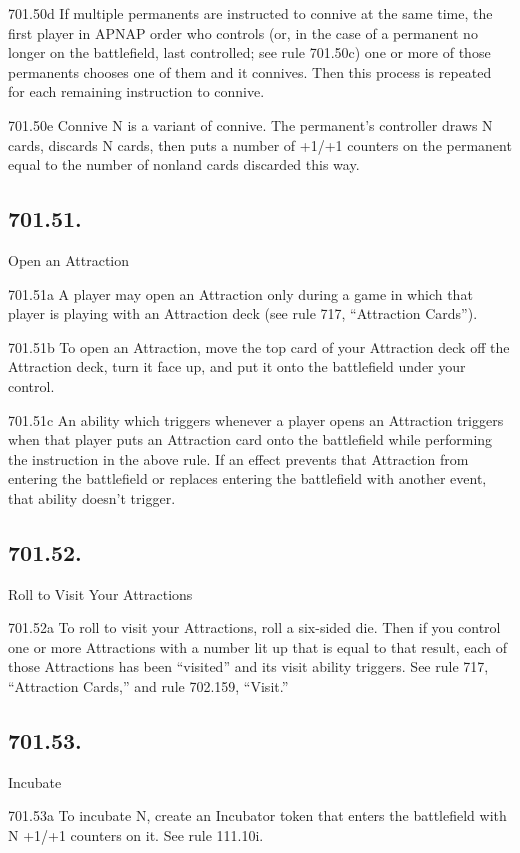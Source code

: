 701.50d If multiple permanents are instructed to connive at the same time, the first player in APNAP order who controls (or, in the case of a permanent no longer on the battlefield, last controlled; see rule 701.50c) one or more of those permanents chooses one of them and it connives. Then this process is repeated for each remaining instruction to connive.

701.50e Connive N is a variant of connive. The permanent’s controller draws N cards, discards N cards, then puts a number of +1/+1 counters on the permanent equal to the number of nonland cards discarded this way.

\subsection*{701.51.}
Open an Attraction

701.51a A player may open an Attraction only during a game in which that player is playing with an Attraction deck (see rule 717, “Attraction Cards”).

701.51b To open an Attraction, move the top card of your Attraction deck off the Attraction deck, turn it face up, and put it onto the battlefield under your control.

701.51c An ability which triggers whenever a player opens an Attraction triggers when that player puts an Attraction card onto the battlefield while performing the instruction in the above rule. If an effect prevents that Attraction from entering the battlefield or replaces entering the battlefield with another event, that ability doesn’t trigger.

\subsection*{701.52.}
Roll to Visit Your Attractions

701.52a To roll to visit your Attractions, roll a six-sided die. Then if you control one or more Attractions with a number lit up that is equal to that result, each of those Attractions has been “visited” and its visit ability triggers. See rule 717, “Attraction Cards,” and rule 702.159, “Visit.”

\subsection*{701.53.}
Incubate

701.53a To incubate N, create an Incubator token that enters the battlefield with N +1/+1 counters on it. See rule 111.10i.


